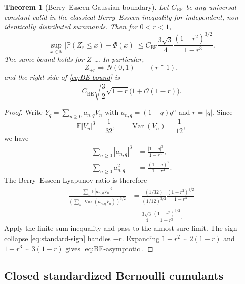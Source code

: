 \documentclass[11pt]{article}
\newtheorem{theorem}{Theorem}[section]
\theoremstyle{definition}
\newcommand{\R}{\mathbb R}
\newcommand{\E}{\mathbb E}
\newcommand{\Pp}{\mathbb P}
\newcommand{\Var}{\operatorname{Var}}
\newcommand{\abs}[1]{\left\lvert #1\right\rvert}
\newcommand{\PhiN}{\Phi}
\newcommand{\BigO}{\mathcal O}
\begin{document}
\begin{theorem}[Berry--Esseen Gaussian boundary]\label{thm:berry-esseen}
Let \(C_{\mathrm{BE}}\) be any universal constant valid in the classical
Berry--Esseen inequality for independent, non-identically distributed summands.  Then
for \(0<r<1\),
\begin{equation}
 \boxed{
 \sup_{x\in\R}\abs{\Pp(Z_r\le x)-\PhiN(x)}
 \le
 C_{\mathrm{BE}}\frac{3\sqrt3}{4}
 \frac{(1-r^2)^{3/2}}{1-r^3}.}                            \label{eq:BE-bound}
\end{equation}
The same bound holds for \(Z_{-r}\).  In particular,
\begin{equation}
 Z_{\pm r}\Longrightarrow N(0,1)
 \qquad(r\uparrow1),                                     \label{eq:Gaussian-limit}
\end{equation}
and the right side of \cref{eq:BE-bound} is
\begin{equation}
 C_{\mathrm{BE}}\sqrt{\frac32}\sqrt{1-r}
 \bigl(1+\BigO(1-r)\bigr).                               \label{eq:BE-asymptotic}
\end{equation}
\end{theorem}

\begin{proof}
Write \(Y_q=\sum_{n\ge0}a_{n,q}V_n\) with
\(a_{n,q}=(1-q)q^n\) and \(r=\lvert q\rvert\).  Since
\[
 \E\abs{V_n}^3=\frac1{32},
 \qquad
 \Var(V_n)=\frac1{12},
\]
we have
\begin{align*}
 \sum_{n\ge0}\abs{a_{n,q}}^3&=\frac{\abs{1-q}^3}{1-r^3},\\
 \sum_{n\ge0}a_{n,q}^2&=\frac{(1-q)^2}{1-r^2}.
\end{align*}
The Berry--Esseen Lyapunov ratio is therefore
\begin{align*}
 \frac{\sum_n\E\abs{a_{n,q}V_n}^3}
 {\left(\sum_n\Var(a_{n,q}V_n)\right)^{3/2}}
 &=\frac{(1/32)}{(1/12)^{3/2}}
   \frac{(1-r^2)^{3/2}}{1-r^3}\\
 &=\frac{3\sqrt3}{4}\frac{(1-r^2)^{3/2}}{1-r^3}.
\end{align*}
Apply the finite-sum inequality and pass to the almost-sure limit.  The sign collapse
\cref{eq:standard-sign} handles \(-r\).  Expanding
\(1-r^2\sim2(1-r)\) and \(1-r^3\sim3(1-r)\) gives
\cref{eq:BE-asymptotic}.
\end{proof}

\subsection{Closed standardized Bernoulli cumulants}
\end{document}
